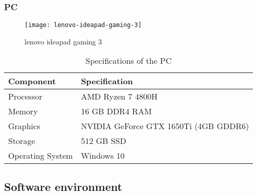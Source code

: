 \subsubsection{PC}
\FloatBarrier
\begin{figure}[h]
         \centering
        \texttt{[image: lenovo-ideapad-gaming-3]}
   
        \caption{lenovo ideapad gaming 3}
        \label{fig:lenovo-ideapad-gaming-3}
    \end{figure}
\FloatBarrier

\begin{table}[h]
\centering
\begin{tabular}{|l|l|}
\hline
\textbf{Component} & \textbf{Specification} \\ \hline
Processor & AMD Ryzen 7 4800H \\ \hline
Memory & 16 GB DDR4 RAM \\ \hline
Graphics & NVIDIA GeForce GTX 1650Ti (4GB GDDR6) \\ \hline
Storage & 512 GB SSD \\ \hline
Operating System & Windows 10 \\ \hline
\end{tabular}
\caption{Specifications of the PC}
\label{table:pc-specifications}
\end{table}

\subsection{Software environment }

